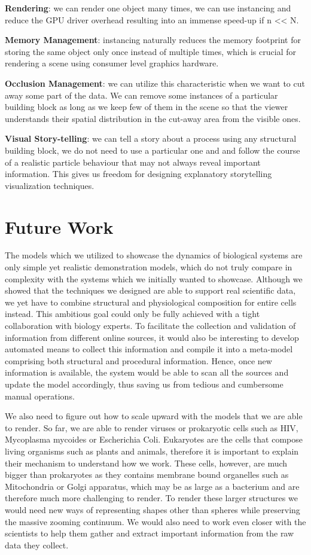 \textbf{Rendering}: we can render one object many times, we can use instancing and reduce the GPU driver overhead resulting into an immense speed-up if n << N.

\textbf{Memory Management}: instancing naturally reduces the memory footprint for storing the same object only once instead of multiple times, which is crucial for rendering a scene using consumer level graphics hardware.

\textbf{Occlusion Management}: we can utilize this characteristic when we want to cut away some part of the data. 
We can remove some instances of a particular building block as long as we keep few of them in the scene so that the viewer understands their spatial distribution in the cut-away area from the visible ones.

\textbf{Visual Story-telling}: we can tell a story about a process using any structural building block, we do not need to use a particular one and and follow the course of a realistic particle behaviour that may not always reveal important information.
This gives us freedom for designing explanatory storytelling visualization techniques.

\section{Future Work}

The models which we utilized to showcase the dynamics of biological systems are only simple yet realistic demonstration models, which do not truly compare in complexity with the systems which we initially wanted to showcase.
Although we showed that the techniques we designed are able to support real scientific data, we yet have to combine structural and physiological composition for entire cells instead.
This ambitious goal could only be fully achieved with a tight collaboration with biology experts.
To facilitate the collection and validation of information from different online sources, it would also be interesting to develop automated means to collect this information and compile it into a meta-model comprising both structural and procedural information.
Hence, once new information is available, the system would be able to scan all the sources and update the model accordingly, thus saving us from tedious and cumbersome manual operations.

We also need to figure out how to scale upward with the models that we are able to render.
So far, we are able to render viruses or prokaryotic cells such as HIV, Mycoplasma mycoides or Escherichia Coli. 
Eukaryotes are the cells that compose living organisms such as plants and animals, therefore it is important to explain their mechanism to understand how we work.
These cells, however, are much bigger than prokaryotes as they contains membrane bound organelles such as Mitochondria or Golgi apparatus, which may be as large as a bacterium and are therefore much more challenging to render.
To render these larger structures we would need new ways of representing shapes other than spheres while preserving the massive zooming continuum.
We would also need to work even closer with the scientists to help them gather and extract important information from the raw data they collect.

